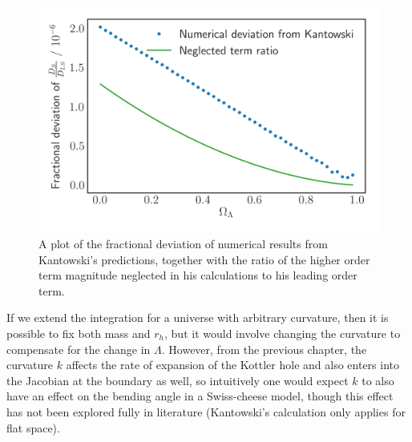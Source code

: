 


\begin{figure}
  \centering
  \includegraphics[height=0.5\linewidth]{images/flat-neglected_const_rh.png}
  \caption{A plot of the fractional deviation of numerical results from Kantowski's predictions, together with the ratio of the higher order term magnitude neglected in his calculations to his leading order term. }
  \label{fig:flat-const-rh-neglected}
\end{figure}

If we extend the integration for a universe with arbitrary curvature, then it is possible to fix both mass and $r_h$, but it would involve changing the curvature to compensate for the change in $\Lambda$. However, from the previous chapter, the curvature $k$ affects the rate of expansion of the Kottler hole and also enters into the Jacobian at the boundary as well, so intuitively one would expect $k$ to also have an effect on the bending angle in a Swiss-cheese model, though this effect has not been explored fully in literature (Kantowski's calculation \citet{kantowski2010gravitational} only applies for flat space). 

